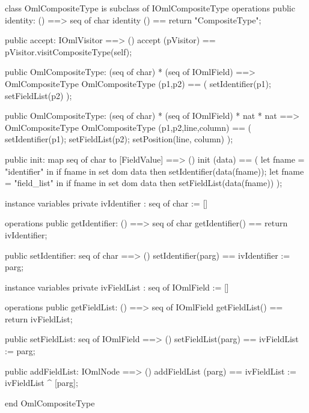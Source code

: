 \begin{vdm_al}
class OmlCompositeType is subclass of IOmlCompositeType
operations
  public identity: () ==> seq of char
  identity () == return "CompositeType";

  public accept: IOmlVisitor ==> ()
  accept (pVisitor) == pVisitor.visitCompositeType(self);

  public OmlCompositeType:
    (seq of char) *
    (seq of IOmlField) ==> OmlCompositeType
  OmlCompositeType (p1,p2) == 
    ( setIdentifier(p1);
      setFieldList(p2) );

  public OmlCompositeType:
    (seq of char) *
    (seq of IOmlField) *
    nat *
    nat ==> OmlCompositeType
  OmlCompositeType (p1,p2,line,column) == 
    ( setIdentifier(p1);
      setFieldList(p2);
      setPosition(line, column) );

  public init: map seq of char to [FieldValue] ==> ()
  init (data) ==
    ( let fname = "identifier" in
        if fname in set dom data
        then setIdentifier(data(fname));
      let fname = "field_list" in
        if fname in set dom data
        then setFieldList(data(fname)) );

instance variables
  private ivIdentifier : seq of char := []

operations
  public getIdentifier: () ==> seq of char
  getIdentifier() == return ivIdentifier;

  public setIdentifier: seq of char ==> ()
  setIdentifier(parg) == ivIdentifier := parg;

instance variables
  private ivFieldList : seq of IOmlField := []

operations
  public getFieldList: () ==> seq of IOmlField
  getFieldList() == return ivFieldList;

  public setFieldList: seq of IOmlField ==> ()
  setFieldList(parg) == ivFieldList := parg;

  public addFieldList: IOmlNode ==> ()
  addFieldList (parg) == ivFieldList := ivFieldList ^ [parg];

end OmlCompositeType
\end{vdm_al}

